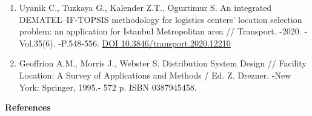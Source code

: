 \begin{enumerate}
{  products with uncertain demands} //
  \href{https://www.sciencedirect.com/journal/expert-systems-with-applications}{Expert
  Systems with Applications}. -2022. -Vol.209(2):118180.
  \href{https://doi.org/10.1016/j.eswa.2022.118180}{DOI
  10.1016/j.eswa.2022.118180}
\item
  Uyanik C., Tuzkaya G., Kalender Z.T., Oguztimur S. An integrated
  DEMATEL--IF-TOPSIS methodology for logistics centers' location
  selection problem: an application for Istanbul Metropolitan area //
  Transport. -2020. -Vol.35(6). -P.548-556.
  \href{https://doi.org/10.3846/transport.2020.12210}{DOI
  10.3846/transport.2020.12210}
\item
  Geoffrion A.M., Morris J., Webster S. Distribution System Design //
  Facility Location: A Survey of Applications and Methods / Ed. Z.
  Drezner. -New York: Springer, 1995.- 572 p. ISBN 0387945458.
\end{enumerate}

{\bfseries References}

